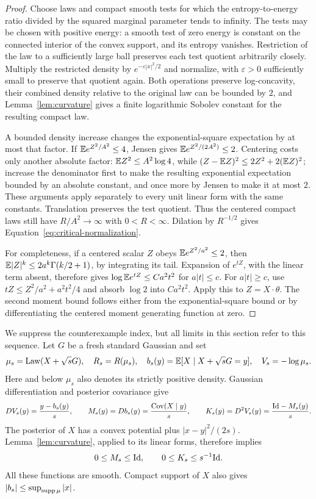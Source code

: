 \begin{proof}
Choose laws and compact smooth tests for which the entropy-to-energy
ratio divided by the squared marginal parameter tends to infinity.
The tests may be chosen with positive energy: a smooth test of zero
energy is constant on the connected interior of the convex support,
and its entropy vanishes. Restriction of the law to a sufficiently
large ball preserves each test quotient arbitrarily closely. Multiply
the restricted density by $e^{-\varepsilon|x|^2/2}$ and normalize,
with $\varepsilon>0$ sufficiently small to preserve that quotient
again. Both operations preserve log-concavity, their combined density
relative to the original law can be bounded by $2$, and
Lemma~\ref{lem:curvature} gives a finite logarithmic Sobolev
constant for the resulting compact law.

A bounded density increase changes the exponential-square expectation
by at most that factor. If $\mathbb E e^{Z^2/A^2}\le4$, Jensen gives
$\mathbb E e^{Z^2/(2A^2)}\le2$. Centering costs only another absolute
factor: $\mathbb E Z^2\le A^2\log4$, while
$(Z-\mathbb E Z)^2\le2Z^2+2(\mathbb E Z)^2$; increase the denominator first
to make the resulting exponential expectation bounded by an absolute
constant, and once more by Jensen to make it at most $2$.
These arguments apply separately to every unit linear form with
the same constants. Translation preserves the test quotient. Thus
the centered compact laws still have $R/A^2\to\infty$ with
$0<R<\infty$. Dilation by $R^{-1/2}$ gives
Equation~\eqref{eq:critical-normalization}.

For completeness, if a centered scalar $Z$ obeys
$\mathbb E e^{Z^2/a^2}\le2$, then
$\mathbb E|Z|^k\le2a^k\Gamma(k/2+1)$, by integrating its tail.
Expansion of $e^{tZ}$, with the linear term absent, therefore gives
$\log\mathbb E e^{tZ}\le Ca^2t^2$ for $a|t|\le c$.
For $a|t|\ge c$, use
$tZ\le Z^2/a^2+a^2t^2/4$ and absorb $\log2$ into
$Ca^2t^2$. Apply this to $Z=X\cdot\theta$. The second moment
bound follows either from the exponential-square bound or by
differentiating the centered moment generating function at zero.
\end{proof}

We suppress the counterexample index, but all limits in this section
refer to this sequence. Let $G$ be a fresh standard Gaussian and set
\[
 \mu_s=\operatorname{Law}(X+\sqrt sG),\quad R_s=R(\mu_s),\quad
 b_s(y)=\mathbb E[X\mid X+\sqrt sG=y],\quad V_s=-\log\mu_s.
\]
Here and below $\mu_s$ also denotes its strictly positive density.
Gaussian differentiation and posterior covariance give
\begin{equation}\label{eq:critical-posterior}
 DV_s(y)=\frac{y-b_s(y)}s,\qquad
 M_s(y)=Db_s(y)=\frac{\operatorname{Cov}(X\mid y)}s,\qquad
 K_s(y)=D^2V_s(y)=\frac{\mathrm{Id}-M_s(y)}s.
\end{equation}
The posterior of $X$ has a convex potential plus $|x-y|^2/(2s)$.
Lemma~\ref{lem:curvature}, applied to its linear forms, therefore
implies
\begin{equation}\label{eq:critical-curvature}
 0\le M_s\le\mathrm{Id},\qquad 0\le K_s\le s^{-1}\mathrm{Id}.
\end{equation}
All these functions are smooth. Compact support of $X$ also gives
$|b_s|\le\sup_{\operatorname{supp}\mu}|x|$.

